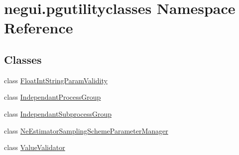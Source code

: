 \hypertarget{namespacenegui_1_1pgutilityclasses}{}\section{negui.\+pgutilityclasses Namespace Reference}
\label{namespacenegui_1_1pgutilityclasses}
\subsection*{Classes}
\begin{DoxyCompactItemize}
\item 
class \hyperlink{classnegui_1_1pgutilityclasses_1_1FloatIntStringParamValidity}{Float\+Int\+String\+Param\+Validity}
\item 
class \hyperlink{classnegui_1_1pgutilityclasses_1_1IndependantProcessGroup}{Independant\+Process\+Group}
\item 
class \hyperlink{classnegui_1_1pgutilityclasses_1_1IndependantSubprocessGroup}{Independant\+Subprocess\+Group}
\item 
class \hyperlink{classnegui_1_1pgutilityclasses_1_1NeEstimatorSamplingSchemeParameterManager}{Ne\+Estimator\+Sampling\+Scheme\+Parameter\+Manager}
\item 
class \hyperlink{classnegui_1_1pgutilityclasses_1_1ValueValidator}{Value\+Validator}
\end{DoxyCompactItemize}
